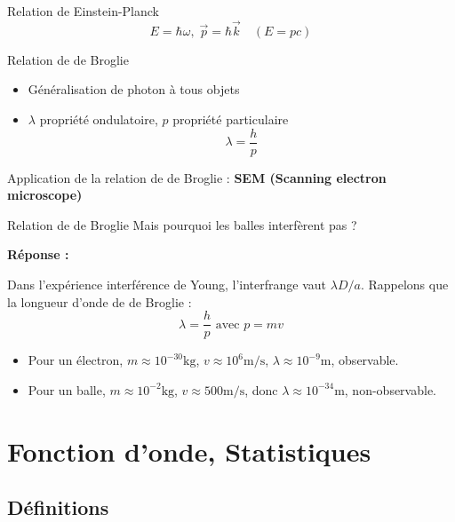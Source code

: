 \begin{Theorem}{Relation de Einstein-Planck}{}
        \[
          \boxed{E = \hbar \omega, \; \overrightarrow{p}  = \hbar \overrightarrow{k} \quad (E = pc)}
        \]
\end{Theorem}

\begin{Theorem}{Relation de de Broglie}{}
        \begin{itemize}
            \item Généralisation de photon à tous objets
            \item $\lambda$ propriété ondulatoire,  $p$ propriété particulaire
                 \[
                   \boxed{ \lambda = \frac{h}{p} }
                \]
        \end{itemize}
\end{Theorem}

Application de la relation de de Broglie : \textbf{SEM (Scanning electron microscope)}

\begin{question}{Relation de de Broglie}{}
Mais pourquoi les balles interfèrent pas ? 

\textbf{Réponse :} 

Dans l'expérience interférence de Young, l'interfrange vaut $\lambda D/a$. Rappelons que la longueur d'onde de de Broglie :
    \[
    \lambda = \frac{h}{p} \text{ avec } p = mv
    \]
\begin{itemize}
    
    \item Pour un électron, $m \approx 10^{-30} \mathrm{kg} $, $v \approx 10^{6} \mathrm{m}/ \mathrm{s}$, $\lambda \approx 10^{-9} \mathrm{m}$, observable.
    \item Pour un balle, $m \approx 10^{-2} \mathrm{kg}$, $v \approx 500 \mathrm{m} / \mathrm{s}$, donc $\lambda \approx 10^{-34} \mathrm{m}$, non-observable.
\end{itemize}

\end{question}

\newpage
\section{Fonction d'onde, Statistiques}

\subsection{Définitions}

